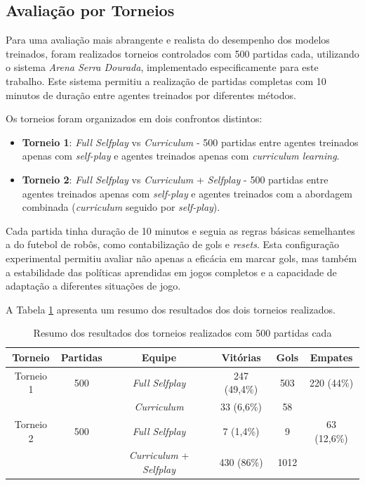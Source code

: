 \subsection{Avaliação por Torneios}

Para uma avaliação mais abrangente e realista do desempenho dos modelos treinados, foram realizados torneios controlados com 500 partidas cada, utilizando o sistema \textit{Arena Serra Dourada}, implementado especificamente para este trabalho. Este sistema permitiu a realização de partidas completas com 10 minutos de duração entre agentes treinados por diferentes métodos.

Os torneios foram organizados em dois confrontos distintos:
\begin{itemize}
    \item \textbf{Torneio 1}: \textit{Full Selfplay} vs \textit{Curriculum} - 500 partidas entre agentes treinados apenas com \textit{self-play} e agentes treinados apenas com \textit{curriculum learning}.
    \item \textbf{Torneio 2}: \textit{Full Selfplay} vs \textit{Curriculum} + \textit{Selfplay} - 500 partidas entre agentes treinados apenas com \textit{self-play} e agentes treinados com a abordagem combinada (\textit{curriculum} seguido por \textit{self-play}).
\end{itemize}

Cada partida tinha duração de 10 minutos e seguia as regras básicas semelhantes a do futebol de robôs, como contabilização de gols e \textit{resets}. Esta configuração experimental permitiu avaliar não apenas a eficácia em marcar gols, mas também a estabilidade das políticas aprendidas em jogos completos e a capacidade de adaptação a diferentes situações de jogo.

A Tabela \ref{tab:resultados_torneios} apresenta um resumo dos resultados dos dois torneios realizados.

\begin{table}[H]
    \centering
    \begin{tabular}{|c|c|c|c|c|c|}
        \hline
        \textbf{Torneio} & \textbf{Partidas} & \textbf{Equipe} & \textbf{Vitórias} & \textbf{Gols} & \textbf{Empates} \\
        \hline
        Torneio 1 & \multicolumn{1}{c|}{500} & \textit{Full Selfplay} & 247 (49,4\%) & 503 & \multicolumn{1}{c|}{220 (44\%)} \\
        \cline{3-5}
        & & \textit{Curriculum} & 33 (6,6\%) & 58 & \\
        \hline
        Torneio 2 & \multicolumn{1}{c|}{500} & \textit{Full Selfplay} & 7 (1,4\%) & 9 & \multicolumn{1}{c|}{63 (12,6\%)} \\
        \cline{3-5}
        & & \textit{Curriculum} + \textit{Selfplay} & 430 (86\%) & 1012 & \\
        \hline
    \end{tabular}
    \caption{Resumo dos resultados dos torneios realizados com 500 partidas cada}
    \label{tab:resultados_torneios}
\end{table}

